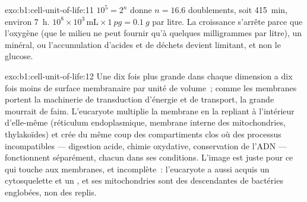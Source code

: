 \begin{solution}{exo:b1:cell-unit-of-life:11}
$10^5 = 2^{n}$ donne $n = 16.6$ doublements, soit \qty{415}{min},
environ \qty{7}{h}.
$10^8\times 10^3\,\mathrm{mL}\times\qty{1}{pg} = \qty{0.1}{g}$
par litre. La croissance s'arrête parce que l'oxygène (que le milieu ne
peut fournir qu'à quelques milligrammes par litre), un minéral, ou
l'accumulation d'acides et de déchets devient limitant, et non le
glucose.
\end{solution}

\begin{solution}{exo:b1:cell-unit-of-life:12}
Une  dix fois plus grande dans chaque dimension a dix fois moins
de surface membranaire par unité de volume~; comme les membranes portent
la machinerie de transduction d'énergie et de transport, la grande
 mourrait de faim. L'eucaryote multiplie la membrane en la
repliant à l'intérieur d'elle-même (réticulum endoplasmique, membrane
interne des mitochondries, thylakoïdes) et crée du même coup des
compartiments clos où des processus incompatibles --- digestion acide,
chimie oxydative, conservation de l'ADN --- fonctionnent séparément,
chacun dans ses conditions. L'image est juste pour ce qui touche aux
membranes, et incomplète~: l'eucaryote a aussi acquis un cytosquelette
et un , et ses mitochondries sont des descendantes de bactéries
englobées, non des replis.
\end{solution}

